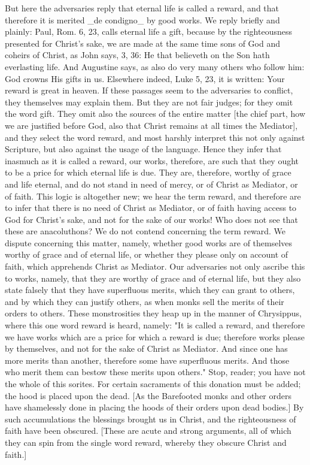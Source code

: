 But here the adversaries reply that eternal life is called a reward,
and that therefore it is merited _de condigno_ by good works.  We
reply briefly and plainly: Paul, Rom. 6, 23, calls eternal life a
gift, because by the righteousness presented for Christ's sake, we
are made at the same time sons of God and coheirs of Christ, as John
says, 3, 36: He that believeth on the Son hath everlasting life.  And
Augustine says, as also do very many others who follow him: God
crowns His gifts in us.  Elsewhere indeed, Luke 5, 23, it is written:
Your reward is great in heaven.  If these passages seem to the
adversaries to conflict, they themselves may explain them.  But they
are not fair judges; for they omit the word gift.  They omit also the
sources of the entire matter [the chief part, how we are justified
before God, also that Christ remains at all times the Mediator], and
they select the word reward, and most harshly interpret this not only
against Scripture, but also against the usage of the language.  Hence
they infer that inasmuch as it is called a reward, our works,
therefore, are such that they ought to be a price for which eternal
life is due.  They are, therefore, worthy of grace and life eternal,
and do not stand in need of mercy, or of Christ as Mediator, or of
faith.  This logic is altogether new; we hear the term reward, and
therefore are to infer that there is no need of Christ as Mediator,
or of faith having access to God for Christ's sake, and not for the
sake of our works!  Who does not see that these are anacoluthons?  We
do not contend concerning the term reward.  We dispute concerning
this matter, namely, whether good works are of themselves worthy of
grace and of eternal life, or whether they please only on account of
faith, which apprehends Christ as Mediator.  Our adversaries not only
ascribe this to works, namely, that they are worthy of grace and of
eternal life, but they also state falsely that they have superfluous
merits, which they can grant to others, and by which they can justify
others, as when monks sell the merits of their orders to others.
These monstrosities they heap up in the manner of Chrysippus, where
this one word reward is heard, namely: "It is called a reward, and
therefore we have works which are a price for which a reward is due;
therefore works please by themselves, and not for the sake of Christ
as Mediator.  And since one has more merits than another, therefore
some have superfluous merits.  And those who merit them can bestow
these merits upon others." Stop, reader; you have not the whole of
this sorites.  For certain sacraments of this donation must be added;
the hood is placed upon the dead.  [As the Barefooted monks and other
orders have shamelessly done in placing the hoods of their orders
upon dead bodies.] By such accumulations the blessings brought us in
Christ, and the righteousness of faith have been obscured.  [These
are acute and strong arguments, all of which they can spin from the
single word reward, whereby they obscure Christ and faith.]

